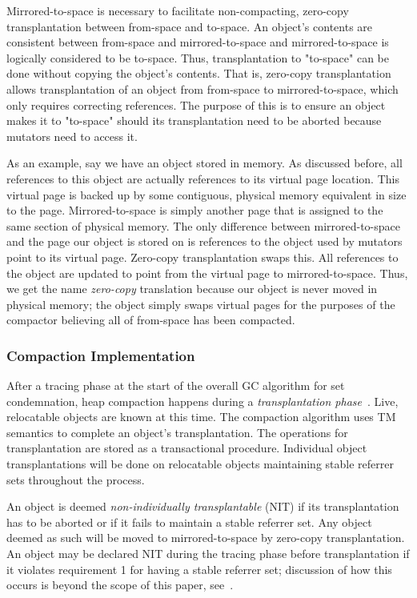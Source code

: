 \documentclass{sig-alternate}
\begin{document}
Mirrored-to-space is necessary to facilitate non-compacting, zero-copy transplantation 
between from-space and to-space. An object's contents are 
consistent between from-space and mirrored-to-space and mirrored-to-space
is logically considered to be to-space. Thus, transplantation to "to-space"
can be done without copying the object's contents. That is, zero-copy transplantation
allows transplantation of an object from from-space to mirrored-to-space, which only
requires correcting references. The purpose of this is to ensure
an object makes it to "to-space" should its transplantation need 
to be aborted because mutators need to access it.

As an example, say we have an object stored in memory. As discussed before, all references
to this object are actually references to its virtual page location. This virtual page
is backed up by some contiguous, physical memory equivalent in size to the page. 
Mirrored-to-space is simply another page that is assigned to the same section of physical memory. 
The only difference between mirrored-to-space and the page our object is stored on
is references to the object used by mutators point to its virtual page.
Zero-copy transplantation swaps this. All references to the object are
updated to point from the virtual page to mirrored-to-space. 
Thus, we get the name \emph{zero-copy} translation
because our object is never moved in physical memory; the object simply
swaps virtual pages for the purposes of the compactor believing all of from-space
has been compacted.


\subsubsection{Compaction Implementation}
\label{sec:collieAlgorithmImplementation}

After a tracing phase at the start of the overall GC algorithm for set condemnation, heap compaction
happens during a \emph{transplantation phase}~\cite{Iyengar:Collie}.
Live, relocatable objects are known at this time. The compaction 
algorithm uses TM semantics to complete an object's
transplantation. The operations for transplantation are stored as a
transactional procedure. Individual object transplantations will be done on relocatable objects 
maintaining stable referrer sets throughout the process.

An object is deemed \emph{non-individually transplantable} (NIT) if its transplantation
has to be aborted or if it fails to maintain a stable referrer set. 
Any object deemed as such will be moved to mirrored-to-space by zero-copy 
transplantation. An object may be declared NIT during the tracing phase before transplantation
if it violates requirement 1 for having a stable referrer set; discussion
of how this occurs is beyond the scope of this paper, see~\cite{Iyengar:Collie}.
\end{document}
